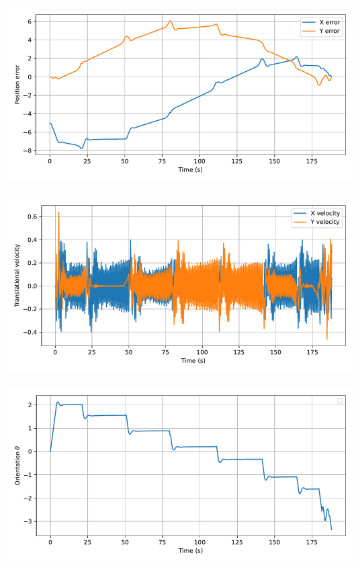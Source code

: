 \begin{figure}[H]
    \centering
    \begin{subfigure}{0.45\linewidth}
        \centering
        \includegraphics[width=\linewidth]{figures/Simulations/sim_rrt/evolution_0.pdf}
    \end{subfigure}
    \begin{subfigure}{0.45\linewidth}
        \centering
        \includegraphics[width=\linewidth]{figures/Simulations/sim_rrt/evolution_1.pdf}
    \end{subfigure}
    \hfill
    \begin{subfigure}{0.45\linewidth}
        \centering
        \includegraphics[width=\linewidth]{figures/Simulations/sim_rrt/evolution_2.pdf}

\end{subfigure}
\end{figure}
